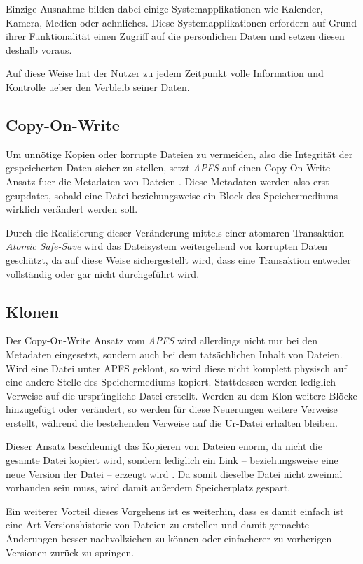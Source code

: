 Einzige Ausnahme bilden dabei einige Systemapplikationen wie Kalender, Kamera,
Medien oder aehnliches. Diese Systemapplikationen erfordern auf Grund ihrer
Funktionalität einen Zugriff auf die persönlichen Daten und setzen diesen
deshalb voraus.

Auf diese Weise hat der Nutzer zu jedem Zeitpunkt volle Information und
Kontrolle ueber den Verbleib seiner Daten.

\subsection{Copy-On-Write}
Um unnötige Kopien oder korrupte Dateien zu vermeiden, also die Integrität der
gespeicherten Daten sicher zu stellen, setzt \textit{APFS} auf einen
Copy-On-Write Ansatz fuer die Metadaten von Dateien \cite{golem}. Diese Metadaten
werden also erst geupdatet, sobald eine Datei beziehungsweise ein Block des
Speichermediums wirklich verändert werden soll.

Durch die Realisierung dieser Veränderung mittels einer atomaren Transaktion
\textit{Atomic Safe-Save} wird das Dateisystem weitergehend vor korrupten Daten
geschützt, da auf diese Weise sichergestellt wird, dass eine Transaktion
entweder vollständig oder gar nicht durchgeführt wird.


\subsection{Klonen}
Der Copy-On-Write Ansatz vom \textit{APFS} wird allerdings nicht nur bei den
Metadaten eingesetzt, sondern auch bei dem tatsächlichen Inhalt von Dateien.
Wird eine Datei unter APFS geklont, so wird diese nicht komplett physisch auf
eine andere Stelle des Speichermediums kopiert. Stattdessen werden lediglich
Verweise auf die ursprüngliche Datei erstellt. Werden zu dem Klon weitere Blöcke
hinzugefügt oder verändert, so werden für diese Neuerungen weitere Verweise
erstellt, während die bestehenden Verweise auf die Ur-Datei erhalten bleiben.

Dieser Ansatz beschleunigt das Kopieren von Dateien enorm, da nicht die gesamte
Datei kopiert wird, sondern lediglich ein Link -- beziehungsweise eine neue
Version der Datei -- erzeugt wird \cite{about_apfs}. Da somit dieselbe Datei nicht
zweimal vorhanden sein muss, wird damit außerdem Speicherplatz gespart.

Ein weiterer Vorteil dieses Vorgehens ist es weiterhin, dass es damit einfach
ist eine Art Versionshistorie von Dateien zu erstellen und damit gemachte
Änderungen besser nachvollziehen zu können oder einfacherer zu vorherigen
Versionen zurück zu springen.

